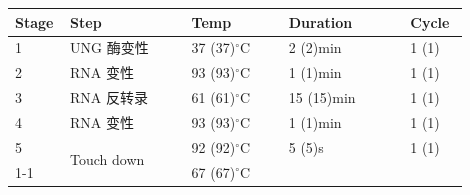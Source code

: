 \documentclass[UTF8,10pt,a4paper,fontset=fandol]{ctexart}
\newcommand{\fieldvalue}[1]{#1}
\newcommand{\handwritten}[1]{#1}
\begin{document}
\begin{tabular}{|p{0.08\linewidth}|p{0.25\linewidth}|p{0.20\linewidth}|p{0.25\linewidth}|p{0.12\linewidth}|}
\hline
Stage & Step & Temp & Duration & Cycle \\ \hline
1 & UNG 酶变性 &
\fieldvalue{\handwritten{37}} (37)$^\circ$C &
\fieldvalue{\handwritten{2}} (2)min &
\fieldvalue{\handwritten{1}} (1)
\\ \hline
2 & RNA 变性 &
\fieldvalue{\handwritten{93}} (93)$^\circ$C &
\fieldvalue{\handwritten{1}} (1)min &
\fieldvalue{\handwritten{1}} (1)
\\ \hline
3 & RNA 反转录 &
\fieldvalue{\handwritten{61}} (61)$^\circ$C &
\fieldvalue{\handwritten{15}} (15)min &
\fieldvalue{\handwritten{1}} (1)
\\ \hline
4 & RNA 变性 &
\fieldvalue{\handwritten{93}} (93)$^\circ$C &
\fieldvalue{\handwritten{1}} (1)min &
\fieldvalue{\handwritten{1}} (1)
\\ \hline
5 & \multirow{10}{*}{Touch down} &
\fieldvalue{\handwritten{92}} (92)$^\circ$C &
\fieldvalue{\handwritten{5}} (5)s &
\fieldvalue{\handwritten{1}} (1)
\\ \cline{1-1}\cline{3-5}
& &
\fieldvalue{\handwritten{67}} (67)$^\circ$C &

\end{tabular}
\end{document}
